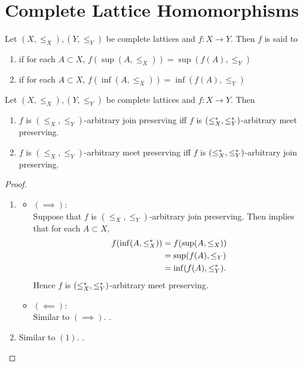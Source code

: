 \documentclass{book}
\begin{document}
	
	
	
	
	\section{Complete Lattice Homomorphisms}
	
	\begin{defn}
		Let $(X, \leq_X), (Y, \leq_Y)$ be complete lattices and $f:X \rightarrow Y$. Then $f$ is said to 
		\begin{enumerate}
			\item {} if for each $A \subset X$, $f(\sup (A, \leq_X) ) = \sup(f(A), \leq_Y)$
			\item {} if for each $A \subset X$, $f(\inf (A, \leq_X) ) = \inf(f(A), \leq_Y)$
		\end{enumerate}
	\end{defn}
	
	\begin{ex}
		Let $(X, \leq_X), (Y, \leq_Y)$ be complete lattices and $f:X \rightarrow Y$. Then 
		\begin{enumerate}
			\item $f$ is $(\leq_X, \leq_Y)$-arbitrary join preserving iff $f$ is $(\leq^*_X, \leq^*_Y)$-arbitrary meet preserving.
			\item $f$ is $(\leq_X, \leq_Y)$-arbitrary meet preserving iff $f$ is $(\leq^*_X, \leq^*_Y)$-arbitrary join preserving.
		\end{enumerate}
	\end{ex}
	
	\begin{proof}\
		\begin{enumerate}
			\item 
			\begin{itemize}
				\item $(\implies)$: \\
				Suppose that $f$ is $(\leq_X, \leq_Y)$-arbitrary join preserving. Then  implies that for each $A \subset X$, 
				\begin{align*}
					f(\inf(A, \leq^*_X))
					& = f(\sup (A, \leq_X)) \\
					& = \sup(f(A), \leq_Y) \\
					& = \inf(f(A), \leq^*_Y).
				\end{align*}
				Hence $f$ is $(\leq^*_X, \leq^*_Y)$-arbitrary meet preserving.
				\item $(\impliedby)$: \\
				Similar to $(\implies)$. .
			\end{itemize}
			\item Similar to $(1)$. .
		\end{enumerate}
	\end{proof}
	
\end{document}
